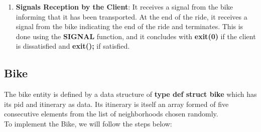 \begin{enumerate}
\begin{lstlisting}[style=customc, caption={sleep and signal functions}]
\end{lstlisting}

  

  \item \textbf{Signals Reception by the Client}: It receives a signal from the bike informing that it has been transported. At the end of the ride, it receives a signal from the bike indicating the end of the ride and terminates. This is done using the \textbf{SIGNAL} function, and it concludes with \textbf{exit(0)} if the client is dissatisfied and \textbf{exit();} if satisfied.
\end{enumerate}
\newpage


\subsection{Bike}
The bike entity is defined by a data structure of \textbf{type def struct bike }which has its pid and itinerary as data. Its itinerary is itself an array formed of five consecutive elements from the list of neighborhoods chosen randomly.\\ To implement the Bike, we will follow the steps below:

